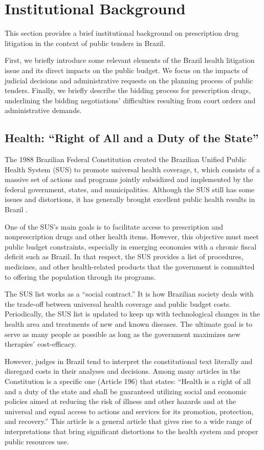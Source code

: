 \section{Institutional Background}
This section provides a brief institutional background on prescription drug litigation in the context of public tenders in Brazil.

First, we briefly introduce some relevant elements of the Brazil health litigation issue and its direct impacts on the public budget. We focus on the impacts of judicial decisions and administrative requests on the planning process of public tenders. Finally, we briefly describe the bidding process for prescription drugs, underlining the bidding negotiations’ difficulties resulting from court orders and administrative demands.

\subsection{Health: “Right of All and a Duty of the State”}
The 1988 Brazilian Federal Constitution created the Brazilian Unified Public Health System (SUS) to promote universal health coverage, t, which consists of a massive set of actions and programs jointly subsidized and implemented by the federal government, states, and municipalities. Although the SUS still has some issues and distortions, it has generally brought excellent public health results in Brazil \citep{castro2019, soares2019}.

One of the SUS’s main goals is to facilitate access to prescription and nonprescription drugs and other health items. However, this objective must meet public budget constraints, especially in emerging economies with a chronic fiscal deficit such as Brazil. In that respect, the SUS provides a list of procedures, medicines, and other health-related products that the government is committed to offering the population through its programs.

The SUS list works as a “social contract.” It is how Brazilian society deals with the trade-off between universal health coverage and public budget costs. Periodically, the SUS list is updated to keep up with technological changes in the health area and treatments of new and known diseases. The ultimate goal is to serve as many people as possible as long as the government maximizes new therapies’ cost-efficacy.

However, judges in Brazil tend to interpret the constitutional text literally and disregard costs in their analyses and decisions. Among many articles in the Constitution is a specific one (Article 196) that states: “Health is a right of all and a duty of the state and shall be guaranteed utilizing social and economic policies aimed at reducing the risk of illness and other hazards and at the universal and equal access to actions and services for its promotion, protection, and recovery.” This article is a general article that gives rise to a wide range of interpretations that bring significant distortions to the health system and proper public resources use.

